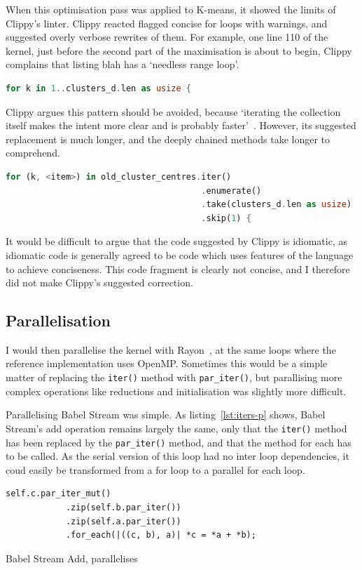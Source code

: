 When this optimisation pass was applied to K-means, it showed the limits of Clippy's linter. Clippy reacted flagged concise for loops with warnings, and suggested overly verbose rewrites of them. For example, one line 110 of the kernel, just before the second part of the maximisation is about to begin, Clippy complains that listing blah has a `needless range loop'.
\begin{lstlisting}[language=Rust]
for k in 1..clusters_d.len as usize {
\end{lstlisting}
Clippy argues this pattern should be avoided, because `iterating the collection itself makes the intent more clear and is probably faster'~\cite{ClippyLoop}. However, its suggested replacement is much longer, and the deeply chained methods take longer to comprehend.
\begin{lstlisting}[language=Rust]
for (k, <item>) in old_cluster_centres.iter()
                                       .enumerate()
                                       .take(clusters_d.len as usize)
                                       .skip(1) {
\end{lstlisting}
It would be difficult to argue that the code suggested by Clippy is idiomatic, as idiomatic code is generally agreed to be code which uses features of the language to achieve conciseness. This code fragment is clearly not concise, and I therefore did not make Clippy's suggested correction.
\subsection{Parallelisation}
I would then parallelise the kernel with Rayon~\cite{RustRayon}, at the same loops where the reference implementation uses OpenMP\@. Sometimes this would be a simple matter of replacing the \texttt{iter()} method with \texttt{par\_iter()}, but parallising more complex operations like reductions and initialisation was slightly more difficult.

Parallelising Babel Stream was simple. As listing~\ref{lst:iters-p} shows, Babel Stream's add operation remains largely the same, only that the \texttt{iter()} method has been replaced by the \texttt{par\_iter()} method, and that the method for each has to be called. As the serial version of this loop had no inter loop dependencies, it coud easily be transformed from a for loop to a parallel for each loop.
\begin{listing}

\label{lst:iters-p}
\begin{verbatim}
self.c.par_iter_mut()
            .zip(self.b.par_iter())
            .zip(self.a.par_iter())
            .for_each(|((c, b), a)| *c = *a + *b);
\end{verbatim}
\caption{Babel Stream Add, parallelises}
\end{listing}

